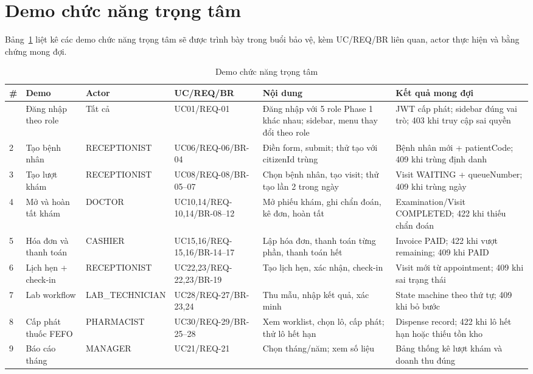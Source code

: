 \section{Demo chức năng trọng tâm}
\label{sec:srs-demo}

Bảng~\ref{tab:srs-demo} liệt kê các demo chức năng trọng tâm sẽ được trình bày trong buổi bảo vệ, kèm UC/REQ/BR liên quan, actor thực hiện và bằng chứng mong đợi.

\begin{longtable}{|p{0.6cm}|p{2.3cm}|p{1.5cm}|p{2.0cm}|p{3.2cm}|p{3.8cm}|}
\caption{Demo chức năng trọng tâm}
\label{tab:srs-demo}\\
\hline
\textbf{\#} & \textbf{Demo} & \textbf{Actor} & \textbf{UC/REQ/BR} & \textbf{Nội dung} & \textbf{Kết quả mong đợi} \\
\hline
\endhead
\hline
\endfoot
1 & Đăng nhập theo role & Tất cả & UC01/REQ-01 & Đăng nhập với 5 role Phase 1 khác nhau; sidebar, menu thay đổi theo role & JWT cấp phát; sidebar đúng vai trò; 403 khi truy cập sai quyền \\
\hline
2 & Tạo bệnh nhân & RECEPTIONIST & UC06/REQ-06/BR-04 & Điền form, submit; thử tạo với citizenId trùng & Bệnh nhân mới + patientCode; 409 khi trùng định danh \\
\hline
3 & Tạo lượt khám & RECEPTIONIST & UC08/REQ-08/BR-05--07 & Chọn bệnh nhân, tạo visit; thử tạo lần 2 trong ngày & Visit WAITING + queueNumber; 409 khi trùng ngày \\
\hline
4 & Mở và hoàn tất khám & DOCTOR & UC10,14/REQ-10,14/BR-08--12 & Mở phiếu khám, ghi chẩn đoán, kê đơn, hoàn tất & Examination/Visit COMPLETED; 422 khi thiếu chẩn đoán \\
\hline
5 & Hóa đơn và thanh toán & CASHIER & UC15,16/REQ-15,16/BR-14--17 & Lập hóa đơn, thanh toán từng phần, thanh toán hết & Invoice PAID; 422 khi vượt remaining; 409 khi PAID \\
\hline
6 & Lịch hẹn + check-in & RECEPTIONIST & UC22,23/REQ-22,23/BR-19 & Tạo lịch hẹn, xác nhận, check-in & Visit mới từ appointment; 409 khi sai trạng thái \\
\hline
7 & Lab workflow & LAB\_TECHNICIAN & UC28/REQ-27/BR-23,24 & Thu mẫu, nhập kết quả, xác minh & State machine theo thứ tự; 409 khi bỏ bước \\
\hline
8 & Cấp phát thuốc FEFO & PHARMACIST & UC30/REQ-29/BR-25--28 & Xem worklist, chọn lô, cấp phát; thử lô hết hạn & Dispense record; 422 khi lô hết hạn hoặc thiếu tồn kho \\
\hline
9 & Báo cáo tháng & MANAGER & UC21/REQ-21 & Chọn tháng/năm; xem số liệu & Bảng thống kê lượt khám và doanh thu đúng \\
\hline
\end{longtable}

